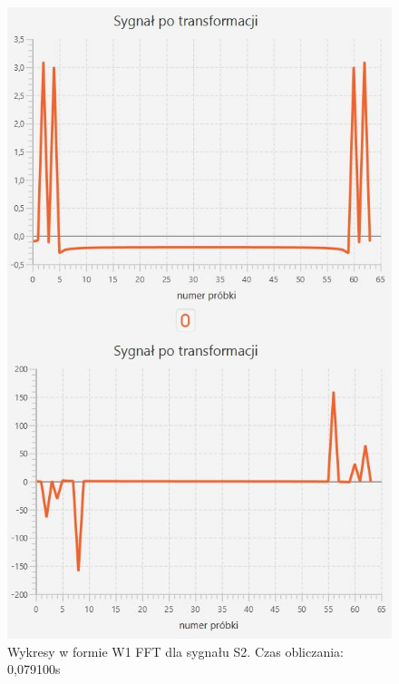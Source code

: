 \documentclass[12pt]{article}
\begin{document}
\begin{figure}[H]
	\centering
	\includegraphics[width=.8\linewidth]{FFT-S2-W1}
	\caption{Wykresy w formie W1 FFT dla sygnału S2. Czas obliczania: 0,079100s}
	\label{S3_sygnal}
\end{figure}
\end{document}
